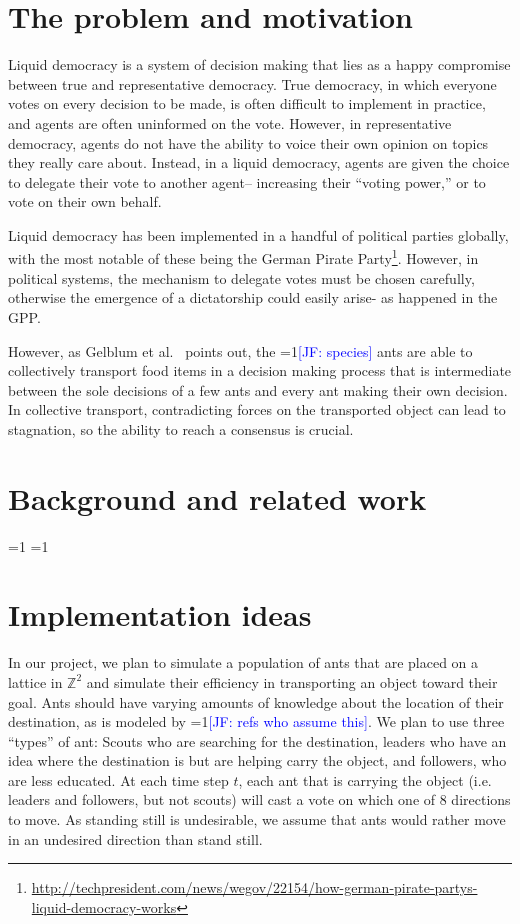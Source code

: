 \documentclass[12pt]{article}
\newcommand{\Comments}{1}
\newcommand{\mynote}[2]{\ifnum\Comments=1\textcolor{#1}{#2}\fi}
\newcommand{\mytodo}[2]{\ifnum\Comments=1%
	\todo[linecolor=#1!80!black,backgroundcolor=#1,bordercolor=#1!80!black]{#2}\fi}
\newcommand{\jessie}[1]{\mynote{blue}{[JF: #1]}}
\newcommand{\jessiet}[1]{\mytodo{blue!20!white}{JF: #1}}
\newcommand{\gabet}[1]{\mytodo{purple!20!white}{GA: #1}}
\begin{document}

\section{The problem and motivation}
Liquid democracy is a system of decision making that lies as a happy compromise between true and representative democracy.
True democracy, in which everyone votes on every decision to be made, is often difficult to implement in practice, and agents are often uninformed on the vote.
However, in representative democracy, agents do not have the ability to voice their own opinion on topics they really care about.
Instead, in a liquid democracy, agents are given the choice to delegate their vote to another agent-- increasing their ``voting power,'' or to vote on their own behalf.


Liquid democracy has been implemented in a handful of political parties globally, with the most notable of these being the German Pirate Party\footnote{\url{http://techpresident.com/news/wegov/22154/how-german-pirate-partys-liquid-democracy-works}}.
However, in political systems, the mechanism to delegate votes must be chosen carefully, otherwise the emergence of a dictatorship could easily arise- as happened in the GPP.

However, as Gelblum et al.~\cite{gelblum2015ant} points out, the \jessie{species} ants are able to collectively transport food items in a decision making process that is intermediate between the sole decisions of a few ants and every ant making their own decision.
In collective transport, contradicting forces on the transported object can lead to stagnation, so the ability to reach a consensus is crucial.

\section{Background and related work}
\jessiet{Add in lit review}
\gabet{Add in lit review}

\section{Implementation ideas}
In our project, we plan to simulate a population of ants that are placed on a lattice in $\mathbb{Z}^2$ and simulate their efficiency in transporting an object toward their goal.
Ants should have varying amounts of knowledge about the location of their destination, as is modeled by \jessie{refs who assume this}.
We plan to use three ``types'' of ant: Scouts who are searching for the destination, leaders who have an idea where the destination is but are helping carry the object, and followers, who are less educated.
At each time step $t$, each ant that is carrying the object (i.e. leaders and followers, but not scouts) will cast a vote on which one of 8 directions to move.
As standing still is undesirable, we assume that ants would rather move in an undesired direction than stand still.
\end{document}
